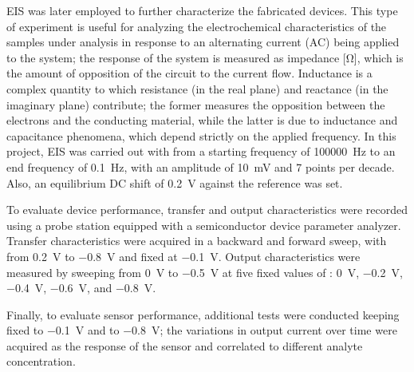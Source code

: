 EIS was later employed to further characterize the fabricated devices. This type of experiment is useful for analyzing the electrochemical characteristics of the samples under analysis in response to an alternating current (AC) being applied to the system; the response of the system is measured as impedance [\unit{\ohm}], which is the amount of opposition of the circuit to the current flow. Inductance is a complex quantity to which resistance (in the real plane) and reactance (in the imaginary plane) contribute; the former measures the opposition between the electrons and the conducting material, while the latter is due to inductance and capacitance phenomena, which depend strictly on the applied frequency. In this project, EIS was carried out with from a starting frequency of \SI{100000}{\hertz} to an end frequency of \SI{0.1}{\hertz}, with an amplitude of \SI{10}{mV} and 7 points per decade. Also, an equilibrium DC shift of \SI{0.2}{V} against the reference was set.

To evaluate device performance, transfer and output characteristics were recorded using a probe station equipped with a semiconductor device parameter analyzer. Transfer characteristics were acquired in a backward and forward sweep, with \vgs{} from \SI{0.2}{\V} to \SI{-0.8}{\V} and \vds{} fixed at \SI{-0.1}{\V}. Output characteristics were measured by sweeping \vds{} from \SI{0}{\volt} to \SI{-0.5}{\volt} at five fixed values of \vgs{}: \SI{0}{\V}, \SI{-0.2}{\V}, \SI{-0.4}{\V}, \SI{-0.6}{\V}, and \SI{-0.8}{\V}.

Finally, to evaluate sensor performance, additional tests were conducted keeping \vds{} fixed to \SI{-0.1}{\V} and \vgs{} to \SI{-0.8}{\V}; the variations in output current over time were acquired as the response of the sensor and correlated to different analyte concentration.